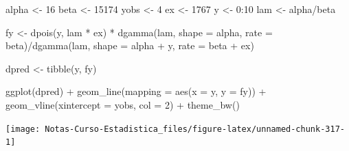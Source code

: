 \documentclass[
  12pt,
]{book}
\newenvironment{Shaded}{\begin{snugshade}}{\end{snugshade}}
\newcommand{\AttributeTok}[1]{\textcolor[rgb]{0.77,0.63,0.00}{#1}}
\newcommand{\DecValTok}[1]{\textcolor[rgb]{0.00,0.00,0.81}{#1}}
\newcommand{\FunctionTok}[1]{\textcolor[rgb]{0.00,0.00,0.00}{#1}}
\newcommand{\NormalTok}[1]{#1}
\newcommand{\OtherTok}[1]{\textcolor[rgb]{0.56,0.35,0.01}{#1}}
\newcommand{\SpecialCharTok}[1]{\textcolor[rgb]{0.00,0.00,0.00}{#1}}
\theoremstyle{definition}
\theoremstyle{definition}
\theoremstyle{definition}
\theoremstyle{definition}
\theoremstyle{remark}
\begin{document}
\begin{Shaded}
\begin{Highlighting}[]
\NormalTok{alpha }\OtherTok{\textless{}{-}} \DecValTok{16}
\NormalTok{beta }\OtherTok{\textless{}{-}} \DecValTok{15174}
\NormalTok{yobs }\OtherTok{\textless{}{-}} \DecValTok{4}
\NormalTok{ex }\OtherTok{\textless{}{-}} \DecValTok{1767}
\NormalTok{y }\OtherTok{\textless{}{-}} \DecValTok{0}\SpecialCharTok{:}\DecValTok{10}
\NormalTok{lam }\OtherTok{\textless{}{-}}\NormalTok{ alpha}\SpecialCharTok{/}\NormalTok{beta}

\NormalTok{fy }\OtherTok{\textless{}{-}} \FunctionTok{dpois}\NormalTok{(y, lam }\SpecialCharTok{*}\NormalTok{ ex) }\SpecialCharTok{*} \FunctionTok{dgamma}\NormalTok{(lam, }\AttributeTok{shape =}\NormalTok{ alpha,}
    \AttributeTok{rate =}\NormalTok{ beta)}\SpecialCharTok{/}\FunctionTok{dgamma}\NormalTok{(lam, }\AttributeTok{shape =}\NormalTok{ alpha }\SpecialCharTok{+}\NormalTok{ y, }\AttributeTok{rate =}\NormalTok{ beta }\SpecialCharTok{+}
\NormalTok{    ex)}

\NormalTok{dpred }\OtherTok{\textless{}{-}} \FunctionTok{tibble}\NormalTok{(y, fy)}

\FunctionTok{ggplot}\NormalTok{(dpred) }\SpecialCharTok{+} \FunctionTok{geom\_line}\NormalTok{(}\AttributeTok{mapping =} \FunctionTok{aes}\NormalTok{(}\AttributeTok{x =}\NormalTok{ y, }\AttributeTok{y =}\NormalTok{ fy)) }\SpecialCharTok{+}
    \FunctionTok{geom\_vline}\NormalTok{(}\AttributeTok{xintercept =}\NormalTok{ yobs, }\AttributeTok{col =} \DecValTok{2}\NormalTok{) }\SpecialCharTok{+} \FunctionTok{theme\_bw}\NormalTok{()}
\end{Highlighting}
\end{Shaded}

\begin{center}\texttt{[image: Notas-Curso-Estadistica\_files/figure-latex/unnamed-chunk-317-1]} \end{center}
\end{document}
